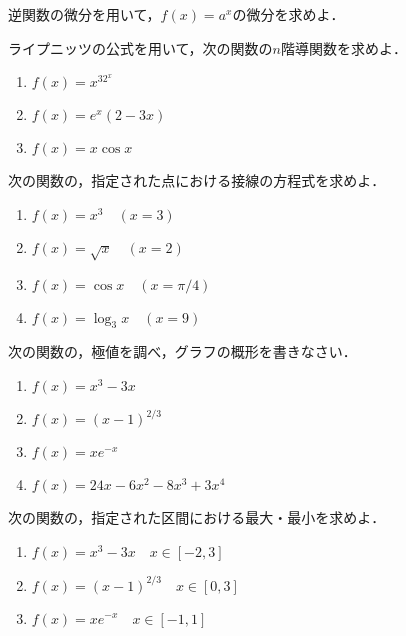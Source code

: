 \begin{question}
	逆関数の微分を用いて，$f(x) = a^x$の微分を求めよ．
\end{question}

\begin{question}
	ライプニッツの公式を用いて，次の関数の$n$階導関数を求めよ．
	\begin{enumerate}[itemsep=2ex, label*=(\arabic*)]
		\item $\displaystyle f(x) = x^32^x$
		\item $\displaystyle f(x) = e^x(2-3x)$
		\item $\displaystyle f(x) = x\cos x$
	\end{enumerate}
\end{question}

\begin{question}
	次の関数の，指定された点における接線の方程式を求めよ．
	\begin{enumerate}[itemsep=2ex, label*=(\arabic*)]
		\item $\displaystyle f(x) = x^3\quad(x = 3)$
		\item $\displaystyle f(x) = \sqrt{x}\quad(x = 2)$
		\item $\displaystyle f(x) = \cos x\quad(x = \pi/4)$
		\item $\displaystyle f(x) = \log_{3} x\quad(x = 9)$
	\end{enumerate}
\end{question}

\begin{question}
	次の関数の，極値を調べ，グラフの概形を書きなさい．
	\begin{enumerate}[itemsep=2ex, label*=(\arabic*)]
		\item $\displaystyle f(x) = x^3-3x$
		\item $\displaystyle f(x) = (x-1)^{2/3}$
		\item $\displaystyle f(x) = xe^{-x}$
		\item $\displaystyle f(x) = 24x - 6x^2 - 8x^3 + 3x^4$
	\end{enumerate}
\end{question}

\begin{question}
	次の関数の，指定された区間における最大・最小を求めよ．
	\begin{enumerate}[itemsep=2ex, label*=(\arabic*)]
		\item $\displaystyle f(x) = x^3-3x\quad x \in \left[-2, 3\right]$
		\item $\displaystyle f(x) = (x-1)^{2/3}\quad x \in \left[0, 3\right]$
		\item $\displaystyle f(x) = xe^{-x}\quad x \in \left[-1, 1\right]$
	\end{enumerate}
\end{question}